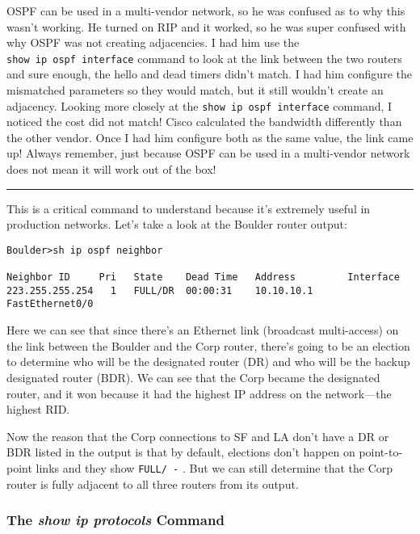OSPF can be used in a multi-vendor network, so he was confused as to why
this wasn't working. He turned on RIP and it worked, so he was super
confused with why OSPF was
\protect\hypertarget{c18.xhtmlux5cux23Page_770}{}{}not creating
adjacencies. I had him use the \texttt{show\ ip\ ospf\ interface}
command to look at the link between the two routers and sure enough, the
hello and dead timers didn't match. I had him configure the mismatched
parameters so they would match, but it still wouldn't create an
adjacency. Looking more closely at the
\texttt{show\ ip\ ospf\ interface} command, I noticed the cost did not
match! Cisco calculated the bandwidth differently than the other vendor.
Once I had him configure both as the same value, the link came up!
Always remember, just because OSPF can be used in a multi-vendor network
does not mean it will work out of the box!

\begin{center}\rule{0.5\linewidth}{0.5pt}\end{center}

This is a critical command to understand because it's extremely useful
in production networks. Let's take a look at the Boulder router output:

\begin{verbatim}
Boulder>sh ip ospf neighbor
 
Neighbor ID     Pri   State    Dead Time   Address         Interface
223.255.255.254   1   FULL/DR  00:00:31    10.10.10.1      FastEthernet0/0
\end{verbatim}

Here we can see that since there's an Ethernet link (broadcast
multi-access) on the link between the Boulder and the Corp router,
there's going to be an election to determine who will be the designated
router (DR) and who will be the backup designated router (BDR). We can
see that the Corp became the designated router, and it won because it
had the highest IP address on the network---the highest RID.

Now the reason that the Corp connections to SF and LA don't have a DR or
BDR listed in the output is that by default, elections don't happen on
point-to-point links and they show \texttt{FULL/\ -} . But we can still
determine that the Corp router is fully adjacent to all three routers
from its output.

\subsubsection[The \emph{show ip protocols}
Command]{\texorpdfstring{\protect\hypertarget{c18.xhtmlux5cux23c18-sec-16}{}{}The
\emph{show ip protocols} Command}{The show ip protocols Command}}


